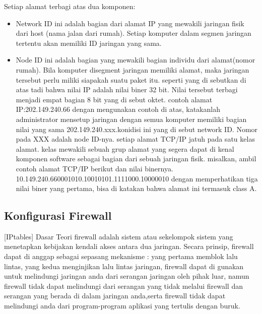 Setiap alamat terbagi atas dua komponen:
\begin{itemize}
  \item Network ID
        ini adalah bagian dari alamat IP yang mewakili jaringan fisik dari host (nama jalan dari rumah). Setiap komputer dalam segmen jaringan tertentu akan memiliki ID jaringan yang sama.
  \item Node ID
        ini adalah bagian yang mewakili bagian individu dari alamat(nomor rumah). Bila komputer disegment jaringan memiliki alamat, maka jaringan tersebut perlu miliki siapakah suatu paket itu.
        seperti yang di sebutkan di atas tadi bahwa nilai IP adalah nilai biner 32 bit. Nilai tersebut terbagi menjadi empat bagian 8 bit yang di sebut oktet. contoh alamat IP:202.149.240.66 dengan mengunakan contoh di atas, katakanlah administrator mensetup jaringan dengan semua komputer memiliki bagian nilai yang sama 202.149.240.xxx.konidisi ini yang di sebut network ID. Nomor pada XXX adalah node ID-nya.
        setiap alamat TCP/IP jatuh pada satu kelas alamat. kelas mewakili sebuah grup alamat yang segera dapat di kenal komponen software sebagai bagian dari sebuah jaringan fisik.
        misalkan, ambil contoh alamat TCP/IP berikut dan nilai binernya. 10.149.240.660001010.10010101.1111000.10000010 dengan memperhatikan tiga nilai biner yang pertama, bisa di katakan bahwa alamat ini termasuk class A.
\end{itemize}

\subsection{Konfigurasi Firewall}[IPtables]
Dasar Teori
firewall adalah sistem atau sekelompok sistem yang menetapkan kebijakan kendali akses antara dua jaringan. Secara prinsip, firewall dapat di anggap sebagai sepasang mekanisme : yang pertama memblok lalu lintas, yang kedua menginjikan lalu lintas jaringan, firewall dapat di gunakan untuk melindungi jaringan anda dari serangan jaringan oleh pihak luar, namun firewall tidak dapat melindungi dari serangan yang tidak melalui firewall dan serangan yang berada di dalam jaringan anda,serta firewall tidak dapat melindungi anda dari program-program aplikasi yang tertulis dengan buruk.

